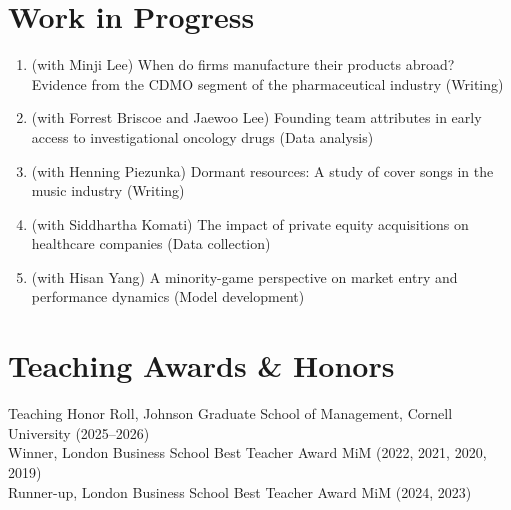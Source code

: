 \documentclass[11pt]{article}
\newenvironment{pubs}
  {\begin{enumerate}[label={(\arabic*)},leftmargin=1.9em,labelsep=0.5em,
     align=left,itemsep=5pt,topsep=3pt]}
  {\end{enumerate}}
\begin{document}
\section{Work in Progress}
\begin{pubs}
\item (with Minji Lee) When do firms manufacture their products abroad? Evidence from the CDMO segment of the pharmaceutical industry {\color{softgray}(Writing)}
\item (with Forrest Briscoe and Jaewoo Lee) Founding team attributes in early access to investigational oncology drugs {\color{softgray}(Data analysis)}
\item (with Henning Piezunka) Dormant resources: A study of cover songs in the music industry {\color{softgray}(Writing)}
\item (with Siddhartha Komati) The impact of private equity acquisitions on healthcare companies {\color{softgray}(Data collection)}
\item (with Hisan Yang) A minority-game perspective on market entry and performance dynamics {\color{softgray}(Model development)}
\end{pubs}
\section{Teaching Awards \& Honors}
\vspace{3pt}
Teaching Honor Roll, Johnson Graduate School of Management, Cornell University (2025--2026)\\
Winner, London Business School Best Teacher Award MiM (2022, 2021, 2020, 2019)\\
Runner-up, London Business School Best Teacher Award MiM (2024, 2023)
\end{document}
